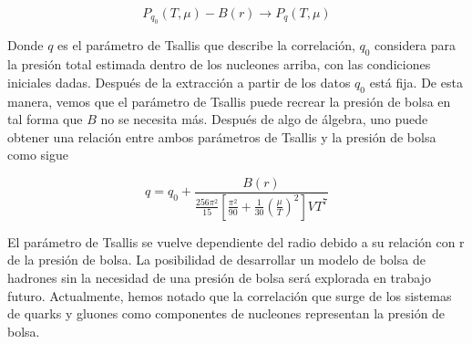 \begin{equation}
{P}_{{q}_{0}} (T,\mu) - B(r) \rightarrow {P}_{q} (T,\mu)
\end{equation}

Donde $q$ es el parámetro de Tsallis que describe la correlación, ${q}_{0}$ considera para la presión total estimada dentro de los nucleones arriba, con las condiciones iniciales dadas. Después de la extracción a partir de los datos ${q}_{0}$ está fija. De esta manera, vemos que el parámetro de Tsallis puede recrear la presión de bolsa en tal forma que $B$ no se necesita más. Después de algo de álgebra, uno puede obtener una relación entre ambos parámetros de Tsallis y la presión de bolsa como sigue

\begin{equation}\label{eq-qasBagPress}
q = {q}_{0} + \frac{B(r)}{\frac{256{\pi}^{2}}{15} \left[\frac{{\pi}^{2}}{90}  + \frac{1}{30} \left( \frac{\mu}{T} \right)^{2}\right] V{T}^{7}}
\end{equation}

El parámetro de Tsallis se vuelve dependiente del radio debido a su relación con r de la presión de bolsa. La posibilidad de desarrollar un modelo de bolsa de hadrones sin la necesidad de una presión de bolsa será explorada en trabajo futuro. Actualmente, hemos notado que la correlación que surge de los sistemas de quarks y gluones como componentes de nucleones representan la presión de bolsa.